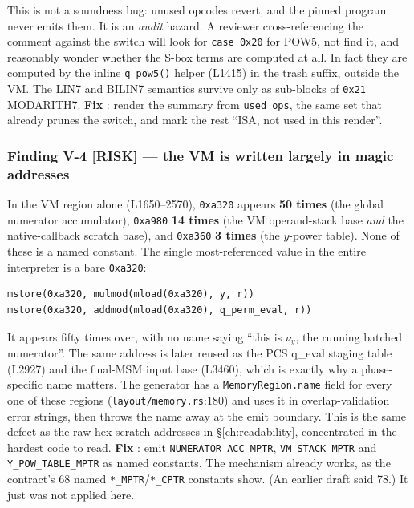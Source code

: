 This is not a soundness bug: unused opcodes revert, and the pinned
program never emits them. It is an \emph{audit} hazard. A reviewer
cross-referencing the comment against the switch will look for
\texttt{case 0x20} for POW5, not find it, and reasonably wonder
whether the S-box terms are computed at all. In fact they are
computed by the inline \texttt{q\_pow5()} helper (L1415) in the
trash suffix, outside the VM. The LIN7 and BILIN7 semantics survive
only as sub-blocks of \texttt{0x21} MODARITH7. \textbf{Fix}
: render the summary from \texttt{used\_ops}, the
same set that already prunes the switch, and mark the rest ``ISA,
not used in this render''.

\subsubsection*{Finding V-4 \textcolor{rustorange}{[RISK]} --- the VM is written largely in magic addresses}

In the VM region alone (L1650--2570), \texttt{0xa320} appears
\textbf{50 times} (the global numerator accumulator),
\texttt{0xa980} \textbf{14 times} (the VM operand-stack base
\emph{and} the native-callback scratch base), and \texttt{0xa360}
\textbf{3 times} (the $y$-power table). None of these is a named
constant. The single most-referenced value in the entire
interpreter is a bare \texttt{0xa320}:

\begin{lstlisting}[style=yul]
mstore(0xa320, mulmod(mload(0xa320), y, r))
mstore(0xa320, addmod(mload(0xa320), q_perm_eval, r))
\end{lstlisting}

It appears fifty times over, with no name saying ``this is $\nu_y$,
the running batched numerator''. The same address is later reused
as the PCS q\_eval staging table (L2927) and the final-MSM input
base (L3460), which is exactly why a phase-specific name matters.
The generator has a \texttt{MemoryRegion.name} field for every one
of these regions (\texttt{layout/memory.rs}:180) and uses it in
overlap-validation error strings, then throws the name away at the
emit boundary. This is the same defect as the raw-hex scratch
addresses in \S\ref{ch:readability}, concentrated in the hardest
code to read. \textbf{Fix} : emit
\texttt{NUMERATOR\_\allowbreak{}ACC\_\allowbreak{}MPTR}, \texttt{VM\_STACK\_MPTR} and
\texttt{Y\_\allowbreak{}POW\_\allowbreak{}TABLE\_\allowbreak{}MPTR} as named constants. The mechanism
already works, as the contract's 68 named
\texttt{*\_MPTR}/\texttt{*\_CPTR} constants show. (An earlier draft
said 78.) It just was not applied here.

